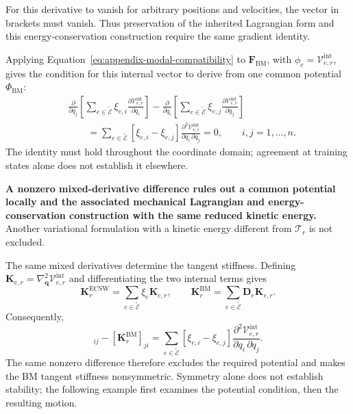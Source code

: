 \documentclass[a4paper,12pt]{article}
\newcommand{\vect}[1]{\boldsymbol{#1}}
\newcommand{\matr}[1]{\boldsymbol{#1}}
\begin{document}
For this derivative to vanish for arbitrary positions and velocities, the vector in brackets must vanish. Thus preservation of the inherited Lagrangian form and this energy-conservation construction require the same gradient identity.

Applying Equation~\eqref{eq:appendix-modal-compatibility} to $\vect{F}_{\mathrm{BM}}$, with $\phi_e=\mathcal V_{e,r}^{\mathrm{int}}$, gives the condition for this internal vector to derive from one common potential $\Phi_{\mathrm{BM}}$:
\begin{equation}
 \begin{aligned}
 &\frac{\partial}{\partial q_j}
  \left[\sum_{e\in\widetilde{\mathcal E}}\xi_{e,i}
        \frac{\partial\mathcal V_{e,r}^{\mathrm{int}}}{\partial q_i}\right]
 -\frac{\partial}{\partial q_i}
  \left[\sum_{e\in\widetilde{\mathcal E}}\xi_{e,j}
        \frac{\partial\mathcal V_{e,r}^{\mathrm{int}}}{\partial q_j}\right]\\
 &\qquad
 =\sum_{e\in\widetilde{\mathcal E}}[\xi_{e,i}-\xi_{e,j}]
    \frac{\partial^2\mathcal V_{e,r}^{\mathrm{int}}}
         {\partial q_i\,\partial q_j}
 =0,\qquad i,j=1,\ldots,n.
 \end{aligned}
 \label{eq:appendix-bm-mechanical-compatibility}
\end{equation}
The identity must hold throughout the coordinate domain; agreement at training states alone does not establish it elsewhere.

\textbf{A nonzero mixed-derivative difference rules out a common potential locally and the associated mechanical Lagrangian and energy-conservation construction with the same reduced kinetic energy.} Another variational formulation with a kinetic energy different from $\mathcal T_r$ is not excluded.

The same mixed derivatives determine the tangent stiffness. Defining $\matr{K}_{e,r}=\nabla_{\vect{q}}^2\mathcal V_{e,r}^{\mathrm{int}}$ and differentiating the two internal terms gives
\begin{equation}
 \matr{K}_r^{\mathrm{ECSW}}
 =\sum_{e\in\widetilde{\mathcal E}}\xi_e\matr{K}_{e,r},
 \qquad
 \matr{K}_r^{\mathrm{BM}}
 =\sum_{e\in\widetilde{\mathcal E}}\matr{D}_e\matr{K}_{e,r}.
 \label{eq:appendix-structural-stiffness}
\end{equation}
Consequently,
\begin{equation}
 [\matr{K}_r^{\mathrm{BM}}]_{ij}
 -[\matr{K}_r^{\mathrm{BM}}]_{ji}
 =\sum_{e\in\widetilde{\mathcal E}}[\xi_{e,i}-\xi_{e,j}]
   \frac{\partial^2\mathcal V_{e,r}^{\mathrm{int}}}
        {\partial q_i\,\partial q_j}.
 \label{eq:appendix-bm-structural-stiffness-asymmetry}
\end{equation}
The same nonzero difference therefore excludes the required potential and makes the BM tangent stiffness nonsymmetric. Symmetry alone does not establish stability; the following example first examines the potential condition, then the resulting motion.
\end{document}
